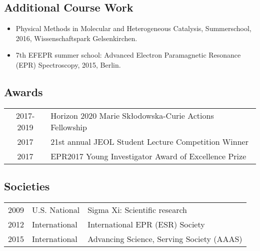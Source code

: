 \subsection*{Additional Course Work} 
\begin{itemize}
\setlength\itemsep{-0.5em}
    \item Physical Methods in Molecular and Heterogeneous Catalysis, Summerschool, 2016,
Wissenschaftspark Gelsenkirchen.
    \item 7th EFEPR summer school: Advanced Electron Paramagnetic Resonance (EPR) Spectroscopy, 2015,
Berlin.
\end{itemize}

\subsection*{Awards} 
\vspace{-0.5em}
\begin{tabular}{cl}
2017-2019 & Horizon 2020 Marie Sk\l{}odowska-Curie Actions Fellowship\\
2017 	& 21st annual JEOL Student Lecture Competition Winner\\
2017 	& EPR2017 Young Investigator Award of Excellence Prize\\
\end{tabular}

\subsection*{Societies} 
\vspace{-0.5em}
\begin{tabular}{rll}
2009 	& U.S. National    & Sigma Xi: Scientific research\\
2012   & International   & International EPR (ESR) Society\\
2015   &  International  & Advancing Science, Serving Society (AAAS)\\
\end{tabular}

